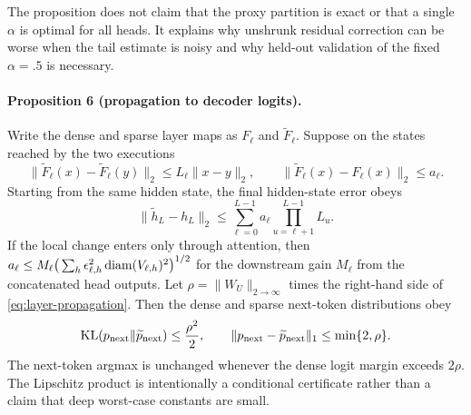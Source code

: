 The proposition does not claim that the proxy partition is exact or that a
single $\alpha$ is optimal for all heads.  It explains why unshrunk residual
correction can be worse when the tail estimate is noisy and why held-out
validation of the fixed $\alpha=.5$ is necessary.

\paragraph{Proposition 6 (propagation to decoder logits).}
Write the dense and sparse layer maps as $F_\ell$ and
$\widetilde F_\ell$.  Suppose on the states reached by the two executions
\begin{equation}
 \|\widetilde F_\ell(x)-\widetilde F_\ell(y)\|_2
 \le L_\ell\|x-y\|_2,\qquad
 \|\widetilde F_\ell(x)-F_\ell(x)\|_2\le a_\ell.
\end{equation}
Starting from the same hidden state, the final hidden-state error obeys
\begin{equation}
 \|\widetilde h_L-h_L\|_2
 \le\sum_{\ell=0}^{L-1}a_\ell
       \prod_{u=\ell+1}^{L-1}L_u.
 \label{eq:layer-propagation}
\end{equation}
If the local change enters only through attention, then
$a_\ell\le M_\ell
\big(\sum_h\epsilon_{\ell,h}^2\operatorname{diam}(V_{\ell,h})^2\big)^{1/2}$
for the downstream gain $M_\ell$ from the concatenated head outputs.
Let $\rho=\|W_U\|_{2\rightarrow\infty}$ times the right-hand side of
\cref{eq:layer-propagation}.  Then the dense and sparse next-token
distributions obey
\begin{equation}
 \mathrm{KL}(p_{\rm next}\|\widetilde p_{\rm next})\le\frac{\rho^2}{2},
 \qquad
 \|p_{\rm next}-\widetilde p_{\rm next}\|_1
 \le\min\{2,\rho\}.
 \label{eq:next-token-stability}
\end{equation}
The next-token argmax is unchanged whenever the dense logit margin exceeds
$2\rho$.
The Lipschitz product is intentionally a conditional certificate rather than
a claim that deep worst-case constants are small.

